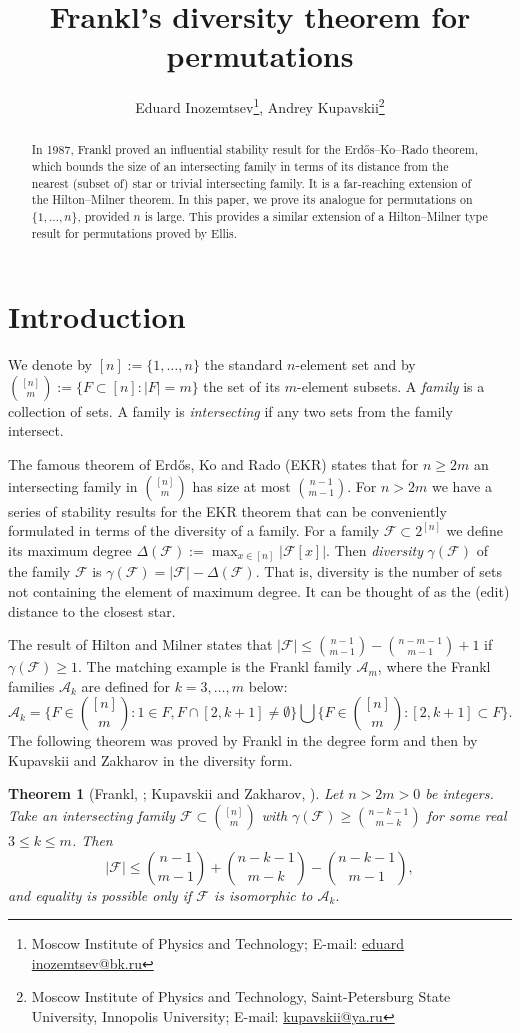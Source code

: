 \documentclass[11pt]{extarticle}
\title{Frankl's diversity theorem for permutations}
\date{}
\author{Eduard Inozemtsev\thanks{Moscow Institute of Physics and Technology;
E-mail: \url{eduard inozemtsev@bk.ru}}, Andrey Kupavskii\thanks{Moscow Institute of Physics and Technology, Saint-Petersburg State University, Innopolis University;
E-mail: \url{kupavskii@ya.ru}}}
\numberwithin{equation}{section} %
\theoremstyle{plain}
\newtheorem{thm}{Theorem}
\theoremstyle{definition}
\newcommand{\FF}{\mathcal{F}}
\newcommand{\m}{\mathcal}
\begin{document}
\maketitle
\begin{abstract}
    In 1987, Frankl proved an influential stability result for the Erd\H os--Ko--Rado theorem, which bounds the size of an intersecting family in terms of its distance from the nearest (subset of) star or trivial intersecting family. It is a far-reaching extension of the Hilton--Milner theorem.  In this paper, we prove its analogue for permutations on $\{1,\ldots, n\}$, provided $n$ is large. This provides a similar extension  of a Hilton--Milner type result for permutations proved by Ellis.
\end{abstract}
\section{Introduction}

We denote by $[n]:=\{ 1, \dots, n\}$ the standard $n$-element set  and by ${[n] \choose m} := \{ F \subset [n] : |F| = m \}$ the set of its $m$-element subsets. A {\it family} is a collection of sets. A family is {\it intersecting} if any two sets from the family intersect. 


The famous theorem of Erd\H os, Ko and Rado  (EKR) \cite{EKR} states that for $n\ge 2m$ an intersecting family in ${[n]\choose m}$ has size at most ${n-1\choose m-1}.$ For $n>2m$ we have a series of stability results for the EKR theorem that can be conveniently formulated in terms of the diversity of a family. For a family $\FF \subset {2^{[n]}}$ we define its maximum degree $\Delta(\FF):=\max_{x \in [n]}|\FF[x]|$. Then {\it diversity} $\gamma(\FF)$ of the family $\FF$ is $\gamma(\FF)=|\FF|-\Delta(\FF).$ That is, diversity is the number of sets not containing the element of maximum degree. It can be thought of as the (edit) distance to the closest star. 

The result of Hilton and Milner \cite{HM} states that $|\m F|\le {n-1\choose m-1}-{n-m-1\choose m-1}+1$ if $\gamma(\m F)\ge 1.$ The matching example is the Frankl family $\m A_m$, where the Frankl families $\m A_k$ are defined for $k=3,\ldots, m$ below:
$$\m A_k = \Big\{F\in {[n]\choose m}:1\in F, F\cap [2,k+1]\ne\emptyset\Big\}\bigcup \Big\{F\in {[n]\choose m}: [2,k+1]\subset F\Big\}.$$
The following theorem was proved by Frankl \cite{Frankl87} in the degree form and then by Kupavskii and Zakharov \cite{KupZak18} in the diversity form.
\begin{thm}[Frankl, \cite{Frankl87}; Kupavskii and Zakharov, \cite{KupZak18}]\label{thmfrdiv}
    Let $n>2m>0$ be integers. Take an intersecting family $\FF\subset {[n]\choose m}$ with $\gamma(\FF)\geq{n-k-1 \choose m-k}$ for some real $3\leq k\leq m$. Then 
    $$|\FF|\leq{n-1 \choose m-1} + {n-k-1 \choose m-k} - {n-k-1 \choose m-1},$$
    and equality is possible only if $\FF$ is isomorphic to $\m A_k.$
\end{thm}
\end{document}
